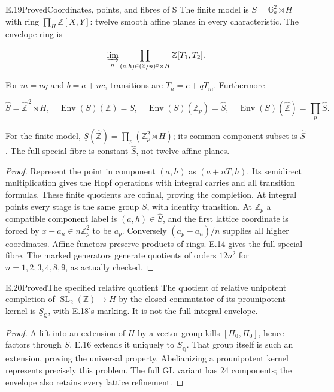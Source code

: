\begin{statement}{E.19}{Proved}{Coordinates, points, and fibres of S}
The finite model is
$\underline S=\mathbb G_a^2\rtimes H$ with ring
$\prod_H\mathbb Z[X,Y]$: twelve smooth affine planes
in every characteristic.
The envelope ring is

$$
\varinjlim_n
 \prod_{(a,h)\in(\mathbb Z/n)^2\rtimes H}\mathbb Z[T_1,T_2].
$$

For $m=nq$ and $b=a+nc$, transitions are $T_n=c+qT_m$.
Furthermore

$$
\widehat S=\widehat{\mathbb Z}^{\,2}\rtimes H,\quad
 \operatorname{Env}(S)(\mathbb Z)=S,\quad
 \operatorname{Env}(S)(\mathbb Z_p)=\widehat S,\quad
 \operatorname{Env}(S)(\widehat{\mathbb Z})=\prod_p\widehat S.
$$

For the finite model,
$\underline S(\widehat{\mathbb Z})=\prod_p(\mathbb Z_p^2\rtimes H)$;
its common-component subset is $\widehat S$.
The full special fibre is constant $\widehat S$, not
twelve affine planes.
\end{statement}
\begin{proof}
Represent the point in component $(a,h)$ as $(a+nT,h)$.
Its semidirect multiplication gives the Hopf operations
with integral carries and all transition formulas.
These finite quotients are cofinal, proving the completion.
At integral points every stage is the same group $S$,
with identity transition.
At $\mathbb Z_p$ a compatible component label is
$(a,h)\in\widehat S$, and the first lattice coordinate
is forced by $x-a_n\in n\mathbb Z_p^2$ to be $a_p$.
Conversely $(a_p-a_n)/n$ supplies all higher coordinates.
Affine functors preserve products of rings.
E.14 gives the full special fibre.
The marked generators generate quotients of orders
$12n^2$ for $n=1,2,3,4,8,9$, as actually checked.
\end{proof}

\begin{statement}{E.20}{Proved}{The specified relative quotient}
The quotient of relative unipotent completion of
$\operatorname{SL}_2(\mathbb Z)\to H$ by the closed
commutator of its prounipotent kernel is
$\underline S_{\mathbb Q}$, with E.18's marking.
It is not the full integral envelope.
\end{statement}
\begin{proof}
A lift into an extension of $H$ by a vector group kills
$[\Pi_0,\Pi_0]$, hence factors through $S$.
E.16 extends it uniquely to $\underline S_{\mathbb Q}$.
That group itself is such an extension, proving the
universal property. Abelianizing a prounipotent kernel
represents precisely this problem.
The full GL variant has 24 components; the envelope
also retains every lattice refinement.
\end{proof}

